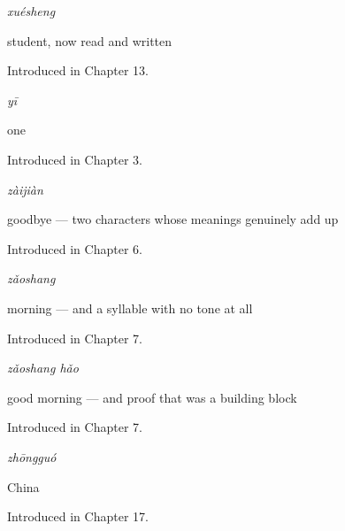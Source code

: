 \noindent\begin{minipage}[t]{\linewidth}
\raggedright
\textbf{}\enspace\emph{xuésheng}\par
\small student, now read and written\par
\footnotesize Introduced in Chapter 13.
\end{minipage}\par\medskip

\noindent\begin{minipage}[t]{\linewidth}
\raggedright
\textbf{}\enspace\emph{yī}\par
\small one\par
\footnotesize Introduced in Chapter 3.
\end{minipage}\par\medskip

\noindent\begin{minipage}[t]{\linewidth}
\raggedright
\textbf{}\enspace\emph{zàijiàn}\par
\small goodbye — two characters whose meanings genuinely add up\par
\footnotesize Introduced in Chapter 6.
\end{minipage}\par\medskip

\noindent\begin{minipage}[t]{\linewidth}
\raggedright
\textbf{}\enspace\emph{zǎoshang}\par
\small morning — and a syllable with no tone at all\par
\footnotesize Introduced in Chapter 7.
\end{minipage}\par\medskip

\noindent\begin{minipage}[t]{\linewidth}
\raggedright
\textbf{}\enspace\emph{zǎoshang hǎo}\par
\small good morning — and proof that  was a building block\par
\footnotesize Introduced in Chapter 7.
\end{minipage}\par\medskip

\noindent\begin{minipage}[t]{\linewidth}
\raggedright
\textbf{}\enspace\emph{zhōngguó}\par
\small China\par
\footnotesize Introduced in Chapter 17.
\end{minipage}\par\medskip

